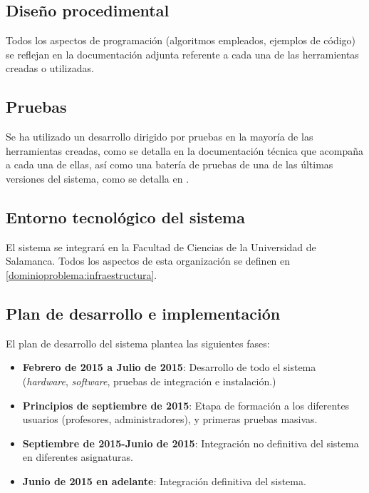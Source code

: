 \subsection{Diseño procedimental}

Todos los aspectos de programación (algoritmos empleados, ejemplos de código) se reflejan en la documentación adjunta referente a cada una de las herramientas creadas o utilizadas.

\subsection{Pruebas}

Se ha utilizado un desarrollo dirigido por pruebas en la mayoría de las herramientas creadas, como se detalla en la documentación técnica que acompaña a cada una de ellas, así como una batería de pruebas de una de las últimas versiones del sistema, como se detalla en \citationneeded[TODO].

\subsection{Entorno tecnológico del sistema}

El sistema se integrará en la Facultad de Ciencias de la Universidad de Salamanca. Todos los aspectos de esta organización se definen en \ref{dominioproblema:infraestructura}.

\subsection{Plan de desarrollo e implementación}

El plan de desarrollo del sistema plantea las siguientes fases:

\begin{itemize}
\item \textbf{Febrero de 2015 a Julio de 2015}: Desarrollo de todo el sistema (\textit{hardware}, \textit{software}, pruebas de integración e instalación.)
\item \textbf{Principios de septiembre de 2015}: Etapa de formación a los diferentes usuarios (profesores, administradores), y primeras pruebas masivas.
\item \textbf{Septiembre de 2015-Junio de 2015}: Integración no definitiva del sistema en diferentes asignaturas.
\item \textbf{Junio de 2015 en adelante}: Integración definitiva del sistema.
\end{itemize}

